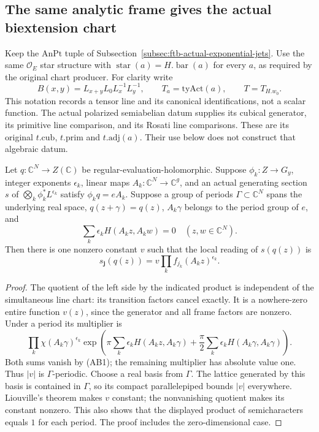 \subsection{The same analytic frame gives the actual biextension chart}
\label{subsec:ftb-actual-analytic-biextension-chart}

Keep the \(\mathrm{AnPt}\) tuple of
Subsection~\ref{subsec:ftb-actual-exponential-jets}.
Use the same \(\mathcal O_E\) star structure with
\(\operatorname{star}(a)=H.\operatorname{bar}(a)\) for every \(a\),
as required by the original chart producer.
For clarity write
\[
       B(x,y)=L_{x+y}L_0L_x^{-1}L_y^{-1},\qquad
       T_a=\mathrm{tyAct}(a),\qquad T=T_{H.w_0}.
\]
This notation records a tensor line and its canonical
identifications, not a scalar function.
The actual polarized semiabelian datum supplies its cubical
generator, its primitive line comparison, and its Rosati line
comparisons. These are its original \(t.\mathrm{cub}\),
\(t.\mathrm{prim}\) and \(t.\mathrm{adj}(a)\).
Their use below does not construct that algebraic datum.

\begin{srlemma}
\label{lem:ftb-generator-forms-cancel}
Let \(q:\mathbb C^N\to Z(\mathbb C)\) be regular-evaluation-holomorphic.
Suppose \(\phi_k:Z\to G_y\), integer exponents \(\epsilon_k\),
linear maps \(A_k:\mathbb C^N\to\mathbb C^g\), and an actual
generating section \(s\) of \(\bigotimes_k\phi_k^*L^{\epsilon_k}\)
satisfy \(\phi_kq=eA_k\).
Suppose a group of periods \(\Gamma\subset\mathbb C^N\)
spans the underlying real space,
\(q(z+\gamma)=q(z)\), \(A_k\gamma\) belongs to the period group
of \(e\), and
\[
                    \sum_k\epsilon_kH(A_kz,A_kw)=0
                                            \quad(z,w\in\mathbb C^N).
                                                               \tag{AB1}
\]
Then there is one nonzero constant \(v\) such that the local
reading of \(s(q(z))\) is
\[
                        s_{\mathbf j}(q(z))
                           =v\prod_k f_{j_k}(A_kz)^{\epsilon_k}.
                                                               \tag{AB2}
\]
\end{srlemma}

\begin{proof}
The quotient of the left side by the indicated product is
independent of the simultaneous line chart: its transition
factors cancel exactly. It is a nowhere-zero entire function
\(v(z)\), since the generator and all frame factors are nonzero.
Under a period its multiplier is
\[
          \prod_k\chi(A_k\gamma)^{\epsilon_k}
          \exp\!\left(\pi\sum_k\epsilon_kH(A_kz,A_k\gamma)
                   +\frac\pi2\sum_k\epsilon_kH(A_k\gamma,A_k\gamma)\right).
\]
Both sums vanish by (AB1); the remaining multiplier has
absolute value one. Thus \(|v|\) is \(\Gamma\)-periodic.
Choose a real basis from \(\Gamma\). The lattice generated by
this basis is contained in \(\Gamma\), so its compact
parallelepiped bounds \(|v|\) everywhere.
Liouville's theorem makes \(v\) constant; the nonvanishing
quotient makes its constant nonzero.
This also shows that the displayed product of semicharacters
equals \(1\) for each period.
The proof includes the zero-dimensional case.
\end{proof}

